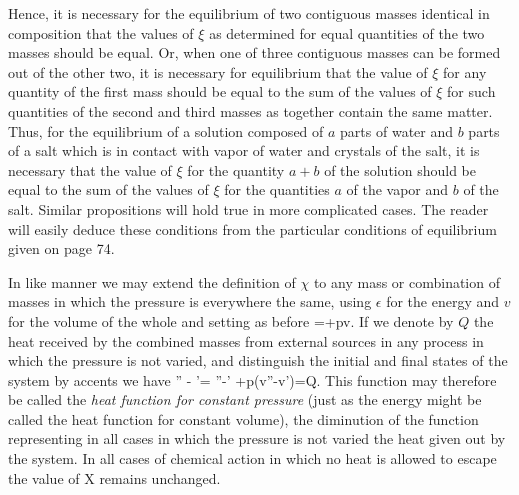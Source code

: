 \documentclass[12pt]{memoir}
\begin{document}
Hence, it is necessary for the equilibrium of two contiguous masses identical in composition that the values of $\xi$ as determined for equal quantities of the two masses should be equal. Or, when one of three contiguous masses can be formed out of the other two, it is necessary for equilibrium that the value of $\xi$ for any quantity of the first mass should be equal to the sum of the values of $\xi$ for such quantities of the second and third masses as together contain the same matter. Thus, for the equilibrium of a solution composed of $a$ parts of water and $b$ parts of a salt which is in contact with vapor of water and crystals of the salt, it is necessary that the value of $\xi$ for the quantity $a+b$ of the solution should be equal to the sum of the values of $\xi$ for the quantities $a$ of the vapor and $b$ of the salt. Similar propositions will hold true in more complicated cases. The reader will easily deduce these conditions from the particular conditions of equilibrium given on page 74.


In like manner we may extend the definition of $\chi$ to any mass or combination of masses in which the pressure is everywhere the same, using $\epsilon$ for the energy and $v$ for the volume of the whole and setting as before
\eqs \chi=\epsilon+pv. \label{118}\eqe
If we denote by $Q$ the heat received by the combined masses from external sources in any process in which the pressure is not varied, and distinguish the initial and final states of the system by accents we have
\eqs \chi'' - \chi'= \epsilon''-\epsilon' +p(v''-v')=Q. \label{119}\eqe
This function may therefore be called the \textit{heat function for constant pressure} (just as the energy might be called the heat function for constant volume), the diminution of the function representing in all cases in which the pressure is not varied the heat given out by the system. In all cases of chemical action in which no heat is allowed to escape the value of X remains unchanged.
\end{document}

